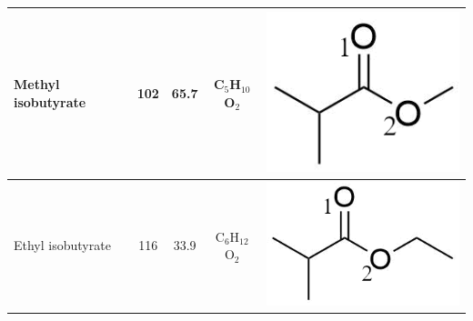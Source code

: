 \begin{table}
\begin{tabular}{lcccc}
\midrule
Methyl isobutyrate &   102 &65.7&   C$_{5}$H$_{10}$O$_2$ & \begin{minipage}[c]{0.13\linewidth}\centering \includegraphics[width=0.8\linewidth]{pics/cocaine-chapter/MEisobuty_struct.png}\end{minipage}\\ 
\midrule
Ethyl isobutyrate &  116 &33.9&   C$_{6}$H$_{12}$O$_2$ & \begin{minipage}[c]{0.17\linewidth}\centering \includegraphics[width=0.8\linewidth]{pics/cocaine-chapter/ETisobuty_struct.png}\end{minipage} \\
\bottomrule
\end{tabular}
\label{tab:structs2}
\end{table}




